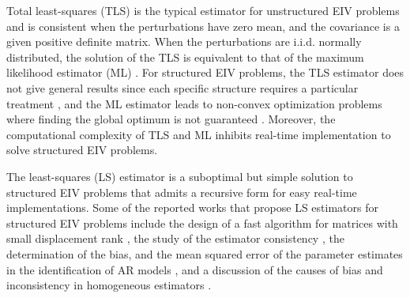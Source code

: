 Total least-squares (TLS) is the typical estimator for unstructured EIV problems and is consistent when the perturbations have zero mean, and the covariance is a given positive definite matrix.
When the perturbations are i.i.d. normally distributed, the solution of the TLS is equivalent to that of the maximum likelihood estimator (ML) \cite{Markovsky07overview}. 
For structured EIV problems, the TLS estimator does not give general results since each specific structure requires a particular treatment \cite{VanHuffel07TLSeditorial}, and the ML estimator leads to non-convex optimization problems where finding the global optimum is not guaranteed \cite{Rhode14recursive}.
Moreover, the computational complexity of TLS and ML inhibits real-time implementation to solve structured EIV problems. 

The least-squares (LS) estimator is a suboptimal but simple solution to structured EIV problems that admits a recursive form for easy real-time implementations.
Some of the reported works that propose LS estimators for structured EIV problems include 
the design of a fast algorithm for matrices with small displacement rank \cite{Mastronardi07fast},
the study of the estimator consistency \cite{Palanthandalam10parameter},
the determination of the bias, and the mean squared error of the parameter estimates in the identification of AR models \cite{Kiviet12high} \cite{Kiviet14improved}, and
a discussion of the causes of bias and inconsistency in homogeneous estimators \cite{Yeredor04homogeneous}.

